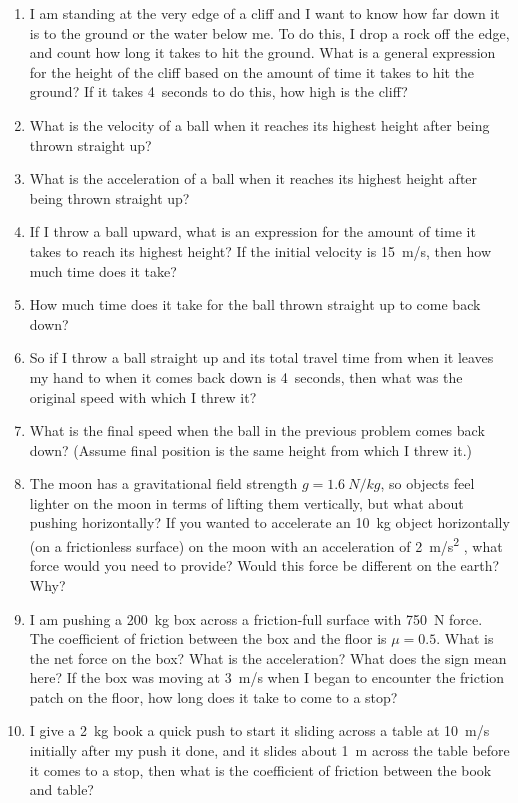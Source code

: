 \begin{enumerate}
\item I am standing at the very edge of a cliff and I want to know how far down it is to the ground or the water below me. To do this, I drop a rock off the edge, and count how long it takes to hit the ground. What is a general expression for the height of the cliff based on the amount of time it takes to hit the ground? If it takes \SI{4}{seconds} to do this, how high is the cliff? 

\item What is the velocity of a ball when it reaches its highest height after being thrown straight up?
\item What is the acceleration of a ball when it reaches its highest height after being thrown straight up?
\item If I throw a ball upward, what is an expression for the amount of time it takes to reach its highest height? If the initial velocity is \SI{15}{m/s}, then how much time does it take? 
\item How much time does it take for the ball thrown straight up to come back down?
\item So if I throw a ball straight up and its total travel time from when it leaves my hand to when it comes back down is \SI{4}{seconds}, then what was the original speed with which I threw it?
\item What is the final speed when the ball in the previous problem comes back down? (Assume final position is the same height from which I threw it.)




\item The moon has a gravitational field strength $g=\SI{1.6}{N/kg}$, so objects feel lighter on the moon in terms of lifting them vertically, but what about pushing horizontally? If you wanted to accelerate an \SI{10}{kg} object horizontally (on a frictionless surface) on the moon with an acceleration of \SI{2}{\meter/\second^2} , what force would you need to provide? Would this force be different on the earth? Why?

\item I am pushing a \SI{200}{\kilogram} box across a friction-full surface with \SI{750}{\newton} force. The coefficient of friction between the box and the floor is $\mu=0.5$. What is the net force on the box? What is the acceleration? What does the sign mean here? If the box was moving at \SI{3}{m/s} when I began to encounter the friction patch on the floor, how long does it take to come to a stop?\bigskip

\item I give a \SI{2}{kg} book a quick push to start it sliding across a table at \SI{10}{m/s} initially after my push it done, and it slides about \SI{1}{m} across the table before it comes to a stop, then what is the coefficient of friction between the book and table?\bigskip





\end{enumerate}